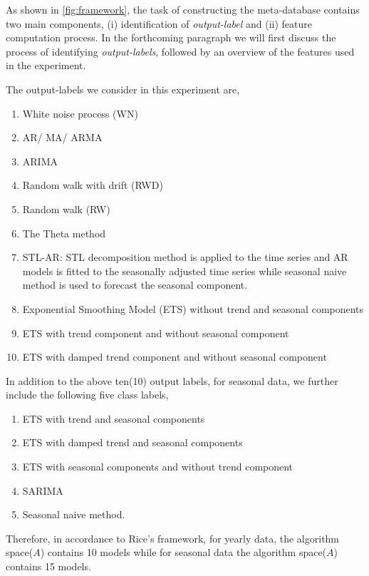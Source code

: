 \documentclass[11pt,]{article}
\theoremstyle{definition}
\theoremstyle{definition}
\theoremstyle{definition}
\theoremstyle{remark}
\begin{document}
As shown in \autoref{fig:framework}, the task of constructing the
meta-database contains two main components, (i) identification of
\emph{output-label} and (ii) feature computation process. In the
forthcoming paragraph we will first discuss the process of identifying
\emph{output-labels}, followed by an overview of the features used in
the experiment.

The output-labels we consider in this experiment are,

\begin{enumerate}
\def\labelenumi{\roman{enumi})}
\item
  White noise process (WN)
\item
  AR/ MA/ ARMA
\item
  ARIMA
\item
  Random walk with drift (RWD)
\item
  Random walk (RW)
\item
  The Theta method
\item
  STL-AR: STL decomposition method is applied to the time series and AR
  models is fitted to the seasonally adjusted time series while seasonal
  naive method is used to forecast the seasonal component.
\item
  Exponential Smoothing Model (ETS) without trend and seasonal
  components
\item
  ETS with trend component and without seasonal component
\item
  ETS with damped trend component and without seasonal component
\end{enumerate}

In addition to the above ten(10) output labels, for seasonal data, we
further include the following five class labels,

\begin{enumerate}
\def\labelenumi{\roman{enumi})}
\setcounter{enumi}{10}
\item
  ETS with trend and seasonal components
\item
  ETS with damped trend and seasonal components
\item
  ETS with seasonal components and without trend component
\item
  SARIMA
\item
  Seasonal naive method.
\end{enumerate}

Therefore, in accordance to Rice's framework, for yearly data, the
algorithm space(\(A\)) contains 10 models while for seasonal data the
algorithm space(\(A\)) contains 15 models.
\end{document}
